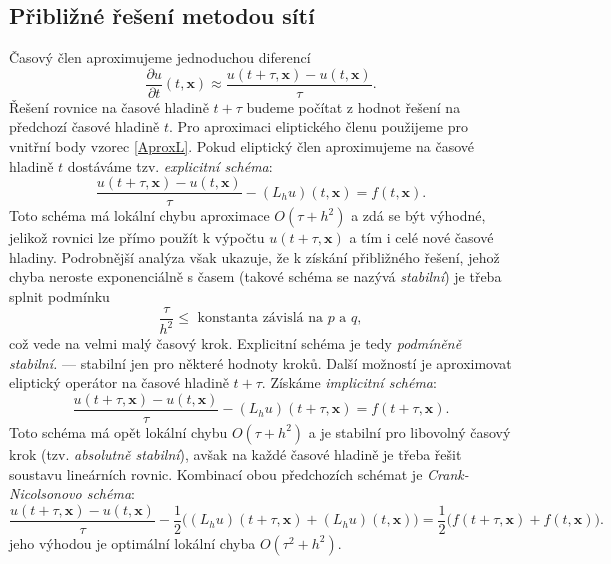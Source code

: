 \documentclass[a4paper,10pt]{article}
\def\vc#1{\mathbf{\boldsymbol{#1}}}     %
\def\prtl{\partial}                                        %
\begin{document}
\subsection{Přibližné řešení metodou sítí}
Časový člen aproximujeme jednoduchou diferencí
\[
   \frac{\prtl u}{\prtl t}(t,\vc x)\approx \frac{u(t+\tau,\vc x)-u(t,\vc x)}{\tau}.
\]
Řešení rovnice na časové hladině $t+\tau$ budeme počítat z hodnot řešení na předchozí časové hladině $t$. 
Pro aproximaci eliptického členu použijeme pro vnitřní body vzorec \eqref{AproxL}. Pokud eliptický 
člen aproximujeme na časové hladině $t$ dostáváme tzv. {\it explicitní schéma}:
\[
   \frac{u(t+\tau,\vc x)-u(t,\vc x)}{\tau} - (L_h u)(t,\vc x)= f(t,\vc x).
\]
Toto schéma má lokální chybu aproximace $O(\tau+h^2)$ a zdá se být výhodné, jelikož rovnici lze přímo použít 
k výpočtu $u(t+\tau,\vc x)$ a tím i celé nové časové hladiny. Podrobnější analýza však ukazuje, že k získání přibližného řešení, jehož chyba neroste exponenciálně s časem (takové schéma se nazývá {\it stabilní}) je třeba splnit podmínku 
\[
  \frac{\tau}{h^2}\le\text{ konstanta závislá na $p$ a $q$},
\]
což vede na velmi malý časový krok. Explicitní schéma je tedy {\it podmíněně stabilní.}
--- stabilní jen pro některé hodnoty kroků.
Další možností je aproximovat eliptický operátor na časové hladině $t+\tau$. Získáme {\it implicitní schéma}:
\[
 \frac{u(t+\tau,\vc x)-u(t,\vc x)}{\tau} - (L_h u)(t+\tau,\vc x)= f(t+\tau,\vc x).
\]
Toto schéma má opět lokální chybu $O(\tau+h^2)$ a je stabilní pro libovolný časový krok (tzv. {\it absolutně stabilní}), avšak na každé časové hladině je třeba řešit soustavu lineárních rovnic. Kombinací obou předchozích schémat je {\it Crank-Nicolsonovo schéma}:
\[
 \frac{u(t+\tau,\vc x)-u(t,\vc x)}{\tau} - \frac12\big((L_h u)(t+\tau,\vc x)+(L_h u)(t,\vc x)\big)= 
    \frac12\big(f(t+\tau,\vc x)+f(t,\vc x)\big).
\]
jeho výhodou je optimální lokální chyba $O(\tau^2+h^2)$. 
\end{document}
